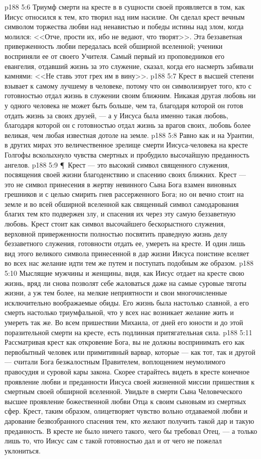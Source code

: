 \vs p188 5:6 Триумф смерти на кресте в в сущности своей проявляется в том, как Иисус относился к тем, кто творил над ним насилие. Он сделал крест вечным символом торжества любви над ненавистью и победы истины над злом, когда молился: <<Отче, прости их, ибо не ведают, что творят>>. Эта беззаветная приверженность любви передалась всей обширной вселенной; ученики восприняли ее от своего Учителя. Самый первый из проповедников его евангелия, отдавший жизнь за это служение, сказал, когда его насмерть забивали камнями: <<Не ставь этот грех им в вину>>.
\vs p188 5:7 Крест в высшей степени взывает к самому лучшему в человеке, потому что он символизирует того, кто с готовностью отдал жизнь в служении своим ближним. Никакая другая любовь ни у одного человека не может быть больше, чем та, благодаря которой он готов отдать жизнь за своих друзей, --- а у Иисуса была именно такая любовь, благодаря которой он с готовностью отдал жизнь за врагов своих, любовь более великая, чем любая известная дотоле на земле.
\vs p188 5:8 Равно как и на Урантии, в других мирах это величественное зрелище смерти Иисуса\hyp{}человека на кресте Голгофы всколыхнуло чувства смертных и пробудило высочайшую преданность ангелов.
\vs p188 5:9 \P\ Крест --- это высокий символ священного служения, посвящения своей жизни благоденствию и спасению своих ближних. Крест --- это не символ принесения в жертву невинного Сына Бога взамен виновных грешников и с целью смирить гнев рассерженного Бога; но он вечно стоит на земле и во всей обширной вселенной как священный символ самодарования благих тем кто подвержен злу, и спасения их через эту самую беззаветную любовь. Крест стоит как символ высочайшего бескорыстного служения, верховной приверженности полностью посвятить праведную жизнь делу беззаветного служения, готовности отдать ее, умереть на кресте. И один лишь вид этого великого символа принесенной в дар жизни Иисуса поистине вселяет во всех нас желание идти тем же путем и поступать подобным же образом.
\vs p188 5:10 Мыслящие мужчины и женщины, видя, как Иисус отдает на кресте свою жизнь, вряд ли снова позволят себе жаловаться даже на самые суровые тяготы жизни, а уж тем более, на мелкие неприятности и свои многочисленные исключительно воображаемые обиды. Его жизнь была настолько славной, а его смерть настолько триумфальной, что у всех нас возникает желание жить и умереть так же. Во всем пришествии Михаила, от дней его юности и до этой поразительной смерти на кресте, есть подлинная притягательная сила.
\vs p188 5:11 Рассматривая крест как откровение Бога, вы не должны воспринимать его как первобытный человек или примитивный варвар, которые --- как тот, так и другой --- считали Бога безжалостным Правителем, воплощением неумолимого правосудия и суровой кары закона. Скорее старайтесь видеть в кресте конечное проявление любви и преданности Иисуса своей жизненной миссии пришествия к смертным своей обширной вселенной. Увидьте в смерти Сына Человеческого высшее проявление божественной любви Отца к своим сыновьям из смертных сфер. Крест, таким образом, олицетворяет чувство вольно отдаваемой любви и дарование безвозбранного спасения тем, кто желают получить такой дар и такую преданность. В кресте не было ничего такого, чего бы требовал Отец, --- а только лишь то, что Иисус сам с такой готовностью дал и от чего не пожелал уклониться.
